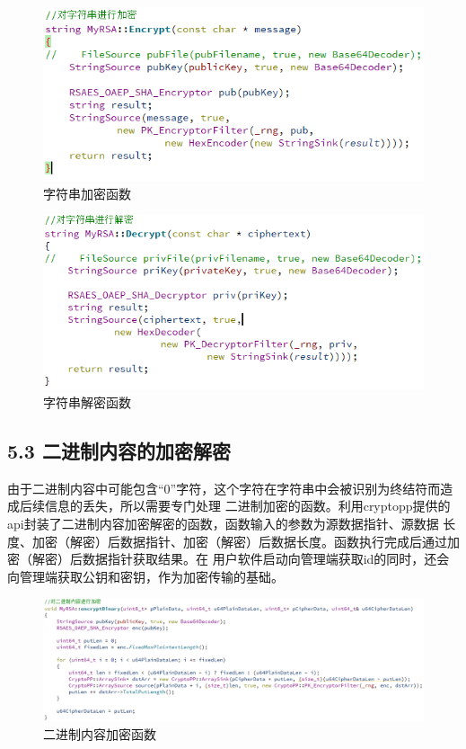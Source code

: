 \documentclass[UTF8]{ctexart}
\begin{document}
\begin{figure}[H]
\includegraphics[width=\textwidth]{pic/strencrypt.PNG}
\caption{字符串加密函数}
\end{figure}

\begin{figure}[H]
\includegraphics[width=\textwidth]{pic/strdecrypt.PNG}
\caption{字符串解密函数}
\end{figure}

\subsection*{5.3 二进制内容的加密解密}
由于二进制内容中可能包含“0”字符，这个字符在字符串中会被识别为终结符而造成后续信息的丢失，所以需要专门处理
二进制加密的函数。利用cryptopp提供的api封装了二进制内容加密解密的函数，函数输入的参数为源数据指针、源数据
长度、加密（解密）后数据指针、加密（解密）后数据长度。函数执行完成后通过加密（解密）后数据指针获取结果。在
用户软件启动向管理端获取id的同时，还会向管理端获取公钥和密钥，作为加密传输的基础。

\begin{figure}[H]
\includegraphics[width=\textwidth]{pic/binaryencrypt.PNG}
\caption{二进制内容加密函数}
\end{figure}
\end{document}
